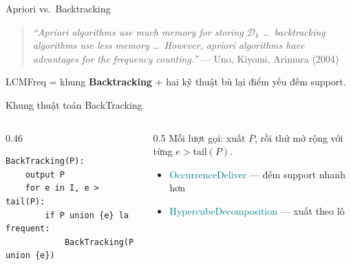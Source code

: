 \documentclass[9pt, aspectratio=169]{beamer}
\newcommand{\hl}[1]{\textcolor{accent}{\textbf{#1}}}
\newcommand{\tc}[1]{\textcolor{teal}{#1}}
\newcommand{\opt}[1]{\textcolor{optgreen}{\textbf{#1}}}
\begin{document}
\begin{frame}{Apriori vs.\ Backtracking}
  \centering

  \vspace{0.5em}
  \begin{quote}
  \small\textit{``Apriori algorithms use much memory for storing
  $\mathcal D_k$ \dots\ backtracking algorithms use less memory \dots\
  However, apriori algorithms have advantages for the frequency
  counting.''} — Uno, Kiyomi, Arimura (2004)
  \end{quote}
  \centering\small LCMFreq = khung \opt{Backtracking} $+$ hai kỹ thuật bù lại
  điểm yếu đếm support.
\end{frame}

\begin{frame}[fragile]{Khung thuật toán BackTracking}
  \begin{columns}[T,onlytextwidth]
    \begin{column}{0.46\textwidth}
\begin{lstlisting}
BackTracking(P):
    output P
    for e in I, e > tail(P):
        if P union {e} la frequent:
            BackTracking(P union {e})
\end{lstlisting}
    \end{column}
    \begin{column}{0.5\textwidth}
      \small Mỗi lượt gọi: xuất $P$, rồi thử mở rộng với từng $e>\mathrm{tail}(P)$.

      \vspace{0.4em}
      \begin{itemize}
        \item<2-> \tc{OccurrenceDeliver} — đếm support nhanh hơn
        \item<3-> \tc{HypercubeDecomposition} — xuất theo lô
      \end{itemize}
    \end{column}
  \end{columns}
\end{frame}
\end{document}
